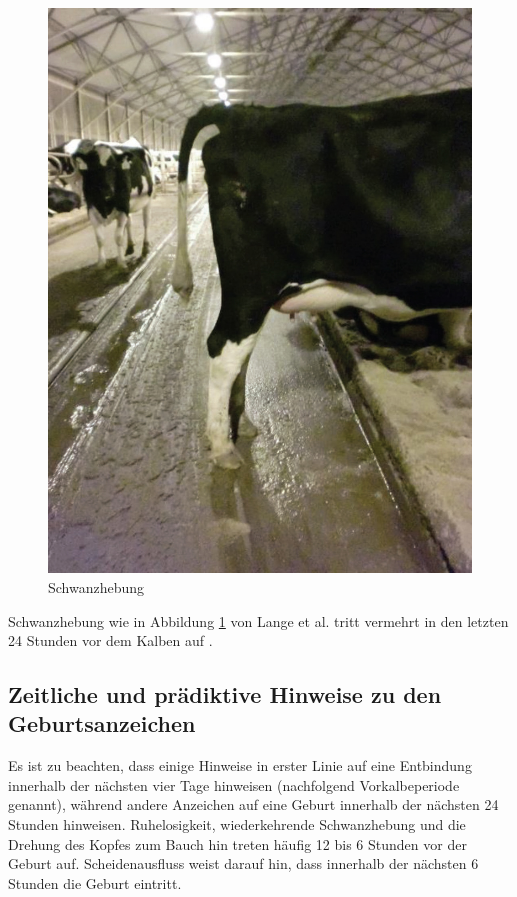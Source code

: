 \begin{figure}[H]
	\center
	\includegraphics[scale=.45]{Grafiken/schwanzhebung.jpg}
	\caption{Schwanzhebung}
	\label{fig: Schwanzhebung}
\end{figure}

Schwanzhebung wie in Abbildung  \ref{fig: Schwanzhebung} von Lange et al. tritt vermehrt in den letzten 24 Stunden vor dem Kalben auf \cite[S. 4847 f.]{Lange2017}.
\subsection{Zeitliche und prädiktive Hinweise zu den Geburtsanzeichen}
Es ist zu beachten, dass einige Hinweise in erster Linie auf eine Entbindung innerhalb der nächsten vier Tage hinweisen (nachfolgend Vorkalbeperiode genannt), während andere Anzeichen auf eine Geburt innerhalb der nächsten 24 Stunden hinweisen. Ruhelosigkeit, wiederkehrende Schwanzhebung und die Drehung des Kopfes zum Bauch hin treten häufig 12 bis 6 Stunden vor der Geburt auf. Scheidenausfluss weist darauf hin, dass innerhalb der nächsten 6 Stunden die Geburt eintritt. \citep[S. 4847]{Lange2017}

